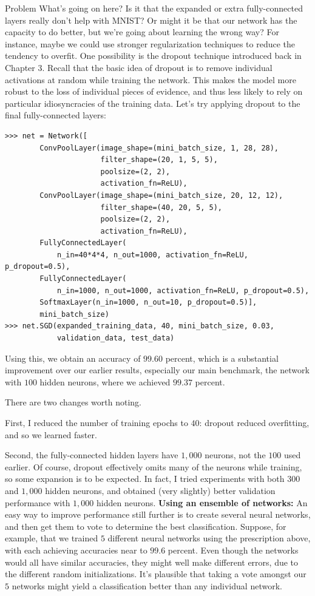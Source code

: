 \begin{exerciseBox}{Problem}
What's going on here? Is it that the expanded or extra fully-connected layers really don't help with MNIST? Or might it be that our network has the capacity to do better, but we're going about learning the wrong way? For instance, maybe we could use stronger regularization techniques to reduce the tendency to overfit. One possibility is the dropout technique introduced back in Chapter 3. Recall that the basic idea of dropout is to remove individual activations at random while training the network. This makes the model more robust to the loss of individual pieces of evidence, and thus less likely to rely on particular idiosyncracies of the training data. Let's try applying dropout to the final fully-connected layers:



\begin{lstlisting}
>>> net = Network([
        ConvPoolLayer(image_shape=(mini_batch_size, 1, 28, 28), 
                      filter_shape=(20, 1, 5, 5), 
                      poolsize=(2, 2), 
                      activation_fn=ReLU),
        ConvPoolLayer(image_shape=(mini_batch_size, 20, 12, 12), 
                      filter_shape=(40, 20, 5, 5), 
                      poolsize=(2, 2), 
                      activation_fn=ReLU),
        FullyConnectedLayer(
            n_in=40*4*4, n_out=1000, activation_fn=ReLU, p_dropout=0.5),
        FullyConnectedLayer(
            n_in=1000, n_out=1000, activation_fn=ReLU, p_dropout=0.5),
        SoftmaxLayer(n_in=1000, n_out=10, p_dropout=0.5)], 
        mini_batch_size)
>>> net.SGD(expanded_training_data, 40, mini_batch_size, 0.03, 
            validation_data, test_data)

\end{lstlisting}


Using this, we obtain an accuracy of $99.60$ percent, which is a substantial improvement over our earlier results, especially our main benchmark, the network with $100$ hidden neurons, where we achieved $99.37$ percent.


There are two changes worth noting.


First, I reduced the number of training epochs to $40$: dropout reduced overfitting, and so we learned faster.


Second, the fully-connected hidden layers have $1,000$ neurons, not the $100$ used earlier. Of course, dropout effectively omits many of the neurons while training, so some expansion is to be expected. In fact, I tried experiments with both $300$ and $1,000$ hidden neurons, and obtained (very slightly) better validation performance with $1,000$ hidden neurons. \textbf{Using an ensemble of networks:} An easy way to improve performance still further is to create several neural networks, and then get them to vote to determine the best classification. Suppose, for example, that we trained $5$ different neural networks using the prescription above, with each achieving accuracies near to $99.6$ percent. Even though the networks would all have similar accuracies, they might well make different errors, due to the different random initializations. It's plausible that taking a vote amongst our $5$ networks might yield a classification better than any individual network.



\end{exerciseBox}
